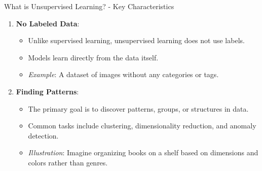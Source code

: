 \documentclass[aspectratio=169]{beamer}
\begin{document}
\begin{frame}[fragile]{What is Unsupervised Learning? - Key Characteristics}
    \begin{enumerate}
        \item \textbf{No Labeled Data}:
            \begin{itemize}
                \item Unlike supervised learning, unsupervised learning does not use labels. 
                \item Models learn directly from the data itself.
                \item \textit{Example}: A dataset of images without any categories or tags.
            \end{itemize}

        \item \textbf{Finding Patterns}:
            \begin{itemize}
                \item The primary goal is to discover patterns, groups, or structures in data.
                \item Common tasks include clustering, dimensionality reduction, and anomaly detection.
                \item \textit{Illustration}: Imagine organizing books on a shelf based on dimensions and colors rather than genres.
            \end{itemize}
    \end{enumerate}
\end{frame}
\end{document}
